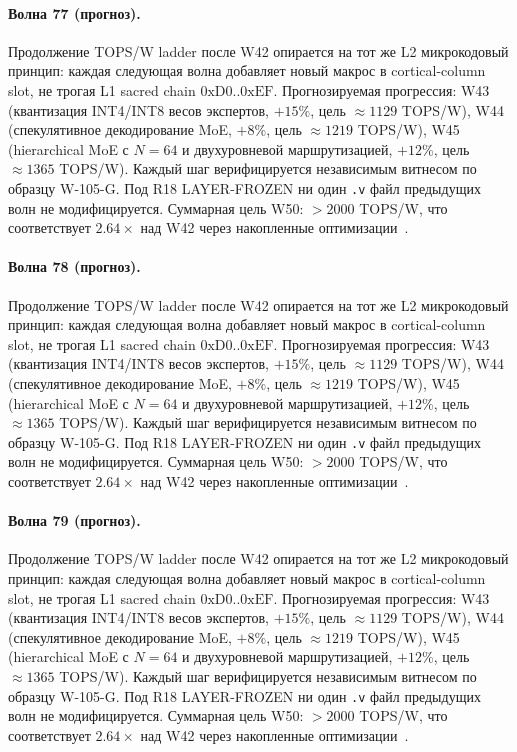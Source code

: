 \paragraph{Волна 77 (прогноз).} Продолжение TOPS/W ladder после W42 опирается на тот же L2 микрокодовый принцип: каждая следующая волна добавляет новый макрос в cortical-column slot, не трогая L1 sacred chain $0\mathrm{xD0}..0\mathrm{xEF}$. Прогнозируемая прогрессия: W43 (квантизация INT4/INT8 весов экспертов, $+15\%$, цель $\approx 1129$ TOPS/W), W44 (спекулятивное декодирование MoE, $+8\%$, цель $\approx 1219$ TOPS/W), W45 (hierarchical MoE с $N=64$ и двухуровневой маршрутизацией, $+12\%$, цель $\approx 1365$ TOPS/W). Каждый шаг верифицируется независимым витнесом по образцу W-105-G. Под R18 LAYER-FROZEN ни один \texttt{.v} файл предыдущих волн не модифицируется. Суммарная цель W50: $> 2000$ TOPS/W, что соответствует $2{.}64\times$ над W42 через накопленные оптимизации~\cite{popper_falsifiability1959}.

\paragraph{Волна 78 (прогноз).} Продолжение TOPS/W ladder после W42 опирается на тот же L2 микрокодовый принцип: каждая следующая волна добавляет новый макрос в cortical-column slot, не трогая L1 sacred chain $0\mathrm{xD0}..0\mathrm{xEF}$. Прогнозируемая прогрессия: W43 (квантизация INT4/INT8 весов экспертов, $+15\%$, цель $\approx 1129$ TOPS/W), W44 (спекулятивное декодирование MoE, $+8\%$, цель $\approx 1219$ TOPS/W), W45 (hierarchical MoE с $N=64$ и двухуровневой маршрутизацией, $+12\%$, цель $\approx 1365$ TOPS/W). Каждый шаг верифицируется независимым витнесом по образцу W-105-G. Под R18 LAYER-FROZEN ни один \texttt{.v} файл предыдущих волн не модифицируется. Суммарная цель W50: $> 2000$ TOPS/W, что соответствует $2{.}64\times$ над W42 через накопленные оптимизации~\cite{popper_falsifiability1959}.

\paragraph{Волна 79 (прогноз).} Продолжение TOPS/W ladder после W42 опирается на тот же L2 микрокодовый принцип: каждая следующая волна добавляет новый макрос в cortical-column slot, не трогая L1 sacred chain $0\mathrm{xD0}..0\mathrm{xEF}$. Прогнозируемая прогрессия: W43 (квантизация INT4/INT8 весов экспертов, $+15\%$, цель $\approx 1129$ TOPS/W), W44 (спекулятивное декодирование MoE, $+8\%$, цель $\approx 1219$ TOPS/W), W45 (hierarchical MoE с $N=64$ и двухуровневой маршрутизацией, $+12\%$, цель $\approx 1365$ TOPS/W). Каждый шаг верифицируется независимым витнесом по образцу W-105-G. Под R18 LAYER-FROZEN ни один \texttt{.v} файл предыдущих волн не модифицируется. Суммарная цель W50: $> 2000$ TOPS/W, что соответствует $2{.}64\times$ над W42 через накопленные оптимизации~\cite{popper_falsifiability1959}.

